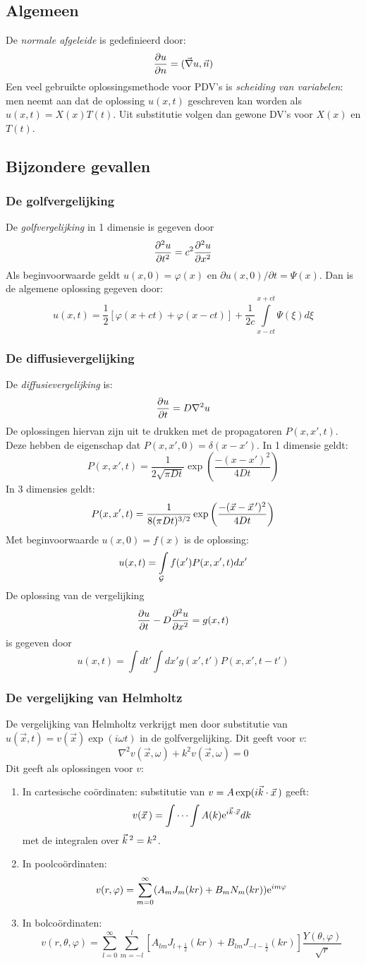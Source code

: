 \documentclass[twoside]{report}
\begin{document}
\subsection{Algemeen}
De {\it normale afgeleide} is gedefinieerd door:
\[
\frac{\partial u}{\partial n}=(\vec{\nabla}u,\vec{n})
\]
Een veel gebruikte oplossingsmethode voor PDV's is {\it scheiding van
variabelen}: men neemt aan dat de oplossing $u(x,t)$ geschreven kan worden
als $u(x,t)=X(x)T(t)$. Uit substitutie volgen dan gewone DV's voor $X(x)$ en
$T(t)$.

\subsection{Bijzondere gevallen}
\subsubsection{De golfvergelijking}
De {\it golfvergelijking} in 1 dimensie is gegeven door
\[
\frac{\partial^2 u}{\partial t^2}=c^2\frac{\partial^2 u}{\partial x^2}
\]
Als beginvoorwaarde geldt $u(x,0)=\varphi(x)$ en
$\partial u(x,0)/\partial t=\Psi(x)$. Dan is de algemene oplossing gegeven
door:
\[
u(x,t)=\frac{1}{2}\left[\varphi(x+ct)+\varphi(x-ct)\right]+\frac{1}{2c}
\int\limits_{x-ct}^{x+ct}\Psi(\xi)d\xi
\]

\subsubsection{De diffusievergelijking}
De {\it diffusievergelijking} is:
\[
\frac{\partial u}{\partial t}=D\nabla^2u
\]
De oplossingen hiervan zijn uit te drukken met de propagatoren $P(x,x',t)$.
Deze hebben de eigenschap dat $P(x,x',0)=\delta(x-x')$. In 1 dimensie geldt:
\[
P(x,x',t)=\frac{1}{2\sqrt{\pi Dt}}\exp\left(\frac{-(x-x')^2}{4Dt}\right)
\]
In 3 dimensies geldt:
\[
P(x,x',t)=\frac{1}{8(\pi Dt)^{3/2}}\exp\left(\frac{-(\vec{x}-\vec{x}\,')^2}{4Dt}\right)
\]
Met beginvoorwaarde $u(x,0)=f(x)$ is de oplossing:
\[
u(x,t)=\int\limits_{\cal G}f(x')P(x,x',t)dx'
\]
De oplossing van de vergelijking
\[
\frac{\partial u}{\partial t}-D\frac{\partial^2 u}{\partial x^2}=g(x,t)
\]
is gegeven door
\[
u(x,t)=\int dt' \int dx'g(x',t')P(x,x',t-t')
\]

\subsubsection{De vergelijking van Helmholtz}
De vergelijking van Helmholtz verkrijgt men door substitutie van
$u(\vec{x},t)=v(\vec{x})\exp(i\omega t)$ in de golfvergelijking. Dit geeft
voor $v$:
\[
\nabla^2v(\vec{x},\omega)+k^2v(\vec{x},\omega)=0
\]
Dit geeft als oplossingen voor $v$:
\begin{enumerate}
\item In cartesische co\"ordinaten: substitutie van
$v=A\exp(i\vec{k}\cdot\vec{x}\,)$ geeft:
\[
v(\vec{x}\,)=\int\cdots\int A(k){\rm e}^{i\vec{k}\cdot\vec{x}}dk
\]
met de integralen over $\vec{k}\,^2=k^2$.
\item In poolco\"ordinaten:
\[
v(r,\varphi)=\sum_{m=0}^\infty(A_mJ_m(kr)+B_mN_m(kr)){\rm e}^{im\varphi}
\]
\item In bolco\"ordinaten:
\[
v(r,\theta,\varphi)=\sum_{l=0}^\infty\sum_{m=-l}^l[A_{lm}J_{l+\frac{1}{2}}(kr)+B_{lm}J_{-l-\frac{1}{2}}(kr)]\frac{Y(\theta,\varphi)}{\sqrt{r}}
\]
\end{enumerate}
\end{document}
